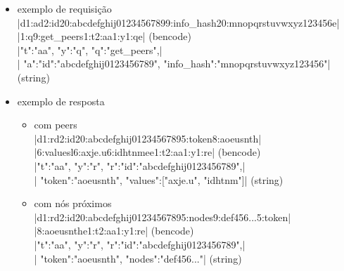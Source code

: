 
\newpage
\begin{itemize}
    \item exemplo de requisição \\
        \bverb|d1:ad2:id20:abcdefghij01234567899:info_hash20:mnopqrstuvwxyz123456e|\\
        \bverb|1:q9:get_peers1:t2:aa1:y1:qe| (\gls*{bencode}) \\
        \sverb|{"t":"aa", "y":"q", "q":"get_peers",|\\
        \sverb| "a":{"id":"abcdefghij0123456789", "info_hash":"mnopqrstuvwxyz123456"}}| (\gls*{string})

    \item exemplo de resposta
        \begin{itemize}
            \item com peers \\
                \bverb|d1:rd2:id20:abcdefghij01234567895:token8:aoeusnth|\\
                \bverb|6:valuesl6:axje.u6:idhtnmee1:t2:aa1:y1:re| (\gls*{bencode}) \\
                \sverb|{"t":"aa", "y":"r", "r":{"id":"abcdefghij0123456789",|\\
                \sverb| "token":"aoeusnth", "values":["axje.u", "idhtnm"]}}|
                (\gls*{string})

            \item com nós próximos \\
                \bverb|d1:rd2:id20:abcdefghij01234567895:nodes9:def456...5:token|\\\bverb|8:aoeusnthe1:t2:aa1:y1:re| (\gls*{bencode}) \\
                \sverb|{"t":"aa", "y":"r", "r":{"id":"abcdefghij0123456789",|\\
                \sverb| "token":"aoeusnth", "nodes":"def456..."}}| (\gls*{string})
        \end{itemize}
\end{itemize}